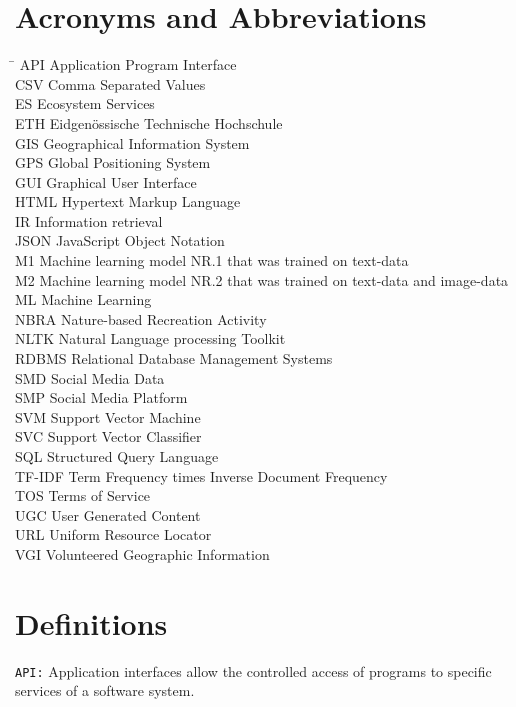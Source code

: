 \section*{Acronyms and Abbreviations}
\begin{tabbing}
 \hspace*{1.6cm}  \= \kill
 API \> Application Program Interface \\
 CSV \> Comma Separated Values \\
 ES \> Ecosystem Services \\
 ETH \> Eidgen\"{o}ssische Technische Hochschule \\
 GIS \> Geographical Information System \\
 GPS \> Global Positioning System \\
 GUI \> Graphical User Interface \\
 HTML \> Hypertext Markup Language \\
 IR \> Information retrieval \\
 JSON \> JavaScript Object Notation \\
 M1 \> Machine learning model NR.1 that was trained on text-data \\
 M2 \> Machine learning model NR.2 that was trained on text-data and image-data \\
 ML \> Machine Learning \\
 NBRA \> Nature-based Recreation Activity \\
 NLTK \> Natural Language processing Toolkit \\ 
 RDBMS \> Relational Database Management Systems \\
 SMD \> Social Media Data \\
 SMP \> Social Media Platform \\
 SVM \> Support Vector Machine \\
 SVC \> Support Vector Classifier \\
 SQL \> Structured Query Language \\
 TF-IDF \> Term Frequency times Inverse Document Frequency \\
 TOS \> Terms of Service \\
 UGC \> User Generated Content \\
 URL \> Uniform Resource Locator \\ 
 VGI \> Volunteered Geographic Information
\end{tabbing}

\section*{Definitions} \label{definitions}
\texttt{API:} Application interfaces allow the controlled access of programs to specific services of a software system. 
\newline

